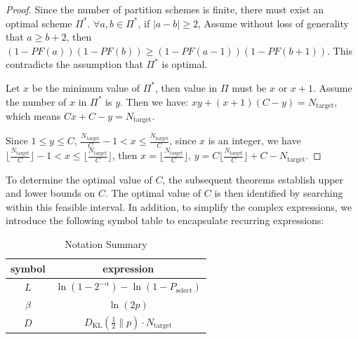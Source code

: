 \documentclass[journal]{IEEEtran}
\begin{document}
\begin{proof}
Since the number of partition schemes is finite, there must exist an optimal scheme $\Pi^*$. $\forall a,b \in \Pi^*$, if $|a-b|\ge2$, Assume without loss of generality that $a\ge b+2$, then $(1-PF(a))(1-PF(b))\ge (1-PF(a-1))(1-PF(b+1))$. This contradicts the assumption that $\Pi^*$ is optimal.

Let $x$ be the minimum value of $\Pi^*$, then value in $\Pi$ must be $x$ or $x+1$. Assume the number of $x$ in $\Pi^*$ is $y$. Then we have: $xy+(x+1)(C-y)=N_{\text{target}}$, which means $Cx+C-y=N_{\text{target}}$. 

Since $1\le y \le C$, $\frac{N_{\text{target}}}{C}-1< x \le \frac{N_{\text{target}}}{C}$, since $x$ is an integer, we have $\lfloor\frac{N_{\text{target}}}{C}\rfloor-1< x \le \lfloor\frac{N_{\text{target}}}{C}\rfloor$, then $x=\lfloor\frac{N_{\text{target}}}{C} \rfloor$, $y=C\lfloor\frac{N_{\text{target}}}{C} \rfloor+C-N_{\text{target}}$.
\end{proof}

To determine the optimal value of $C$, the subsequent theorems establish upper and lower bounds on $C$. The optimal value of $C$ is then identified by searching within this feasible interval. In addition, to simplify the complex expressions, we introduce the following symbol table to encapsulate recurring expressions:
\begin{table}[ht]
    \renewcommand{\arraystretch}{1.4}
    \centering
    \begin{tabular}{c|c}
        symbol & expression \\
        \hline
        $L$ & $\ln(1 - 2^{-\alpha})-\ln \left( 1 - P_{\text{select}}\right)$ \\
        \hline
        $\beta$ & $\ln(2p)$\\
        \hline
        $D$ & $D_{\text{KL}}(\frac{1}{2} \| p) \cdot N_{\text{target}}$
    \end{tabular}
    \vspace{3pt}
    \caption{Notation Summary}
    \label{tab:Notation-Summary}
\end{table}
\end{document}
